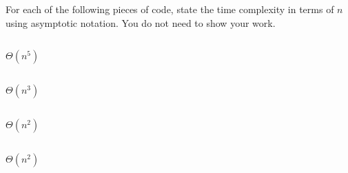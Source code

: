 \begin{prob}
    For each of the following pieces of code, state the time complexity in terms of $n$
    using asymptotic notation. You do not need to show your work.

    \begin{subprobset}

        \begin{subprob}
            \inputminted{python}{\thisdir/include/part_a.py}

            \begin{soln}
                    $\Theta(n^5)$
            \end{soln}
        \end{subprob}

        \begin{subprob}
            \inputminted{python}{\thisdir/include/part_b.py}

            \begin{soln}
                $\Theta(n^3)$
            \end{soln}
        \end{subprob}

        \begin{subprob}
            \inputminted{python}{\thisdir/include/part_c.py}

            \begin{soln}
                $\Theta(n^2)$
            \end{soln}

        \end{subprob}

        \begin{subprob}
            \inputminted{python}{\thisdir/include/part_d.py}

            \begin{soln}
                $\Theta(n^2)$
            \end{soln}

        \end{subprob}

        \begin{subprob}
            \inputminted{python}{\thisdir/include/part_e.py}
            

\end{subprob}
\end{subprobset}
\end{prob}

